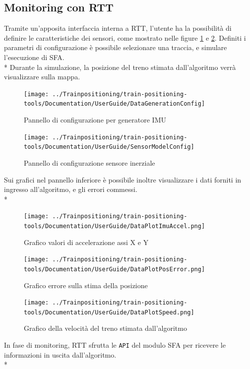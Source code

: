 \subsection{Monitoring con RTT}
Tramite un'apposita interfaccia interna a RTT, l'utente ha la possibilit\`a di definire le caratteristiche dei sensori, come mostrato nelle figure \ref{fig:datagenerationconfig} e \ref{fig:imuconfig}. Definiti i parametri di configurazione \`e possibile selezionare una traccia, e simulare l'esecuzione di SFA.\\* Durante la simulazione, la posizione del treno stimata dall'algoritmo verr\`a visualizzare sulla mappa. 
\begin{figure}[h]
	\centering
	\texttt{[image: ../Trainpositioning/train-positioning-tools/Documentation/UserGuide/DataGenerationConfig]}
	\caption{Pannello di configurazione per generatore IMU}
	\label{fig:datagenerationconfig}
\end{figure}
\begin{figure}[h]
	\centering
	\texttt{[image: ../Trainpositioning/train-positioning-tools/Documentation/UserGuide/SensorModelConfig]}
	\caption{Pannello di configurazione sensore inerziale}
	\label{fig:imuconfig}
\end{figure}
\newpage
Sui grafici nel pannello inferiore \`e possibile inoltre visualizzare i dati forniti in ingresso all'algoritmo, e gli errori commessi.\\*
\begin{figure}[h]
	\centering
	\texttt{[image: ../Trainpositioning/train-positioning-tools/Documentation/UserGuide/DataPlotImuAccel.png]}
	\caption{Grafico valori di accelerazione assi X e Y}
	\label{fig:imuxy}
\end{figure}
\begin{figure}[h]
	\centering
	\texttt{[image: ../Trainpositioning/train-positioning-tools/Documentation/UserGuide/DataPlotPosError.png]}
	\caption{Grafico errore sulla stima della posizione}
	\label{fig:dataplotposerror}
\end{figure}
\begin{figure}[h]
	\centering
	\texttt{[image: ../Trainpositioning/train-positioning-tools/Documentation/UserGuide/DataPlotSpeed.png]}
	\caption{Grafico della velocit\`a del treno stimata dall'algoritmo}
	\label{fig:dataplotspeed}
\end{figure}\clearpage
In fase di monitoring, RTT sfrutta le \texttt{API} del modulo SFA per ricevere le informazioni in uscita dall'algoritmo.\\*
